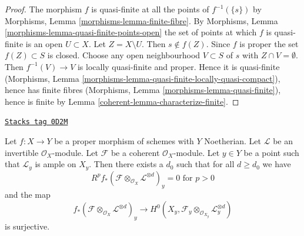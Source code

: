 \begin{proof}

The morphism $f$ is quasi-finite at all the points of $f^{-1}(\{s\})$
by Morphisms, Lemma \ref{morphisms-lemma-finite-fibre}.
By Morphisms, Lemma \ref{morphisms-lemma-quasi-finite-points-open} the
set of points at which $f$ is quasi-finite is an open $U \subset X$.
Let $Z = X \setminus U$. Then $s \not \in f(Z)$. Since $f$ is proper
the set $f(Z) \subset S$ is closed. Choose any open neighbourhood
$V \subset S$ of $s$ with $Z \cap V = \emptyset$. Then
$f^{-1}(V) \to V$ is locally quasi-finite and proper.
Hence it is quasi-finite
(Morphisms, Lemma \ref{morphisms-lemma-quasi-finite-locally-quasi-compact}),
hence has finite fibres
(Morphisms, Lemma \ref{morphisms-lemma-quasi-finite}), hence
is finite by Lemma \ref{coherent-lemma-characterize-finite}.
\end{proof}

\begin{lemma}
\label{coherent-lemma-ample-on-fibre}
\href{https://stacks.math.columbia.edu/tag/0D2M}{\texttt{Stacks tag 0D2M}}

Let $f : X \to Y$ be a proper morphism of schemes with $Y$ Noetherian.
Let $\mathcal{L}$ be an invertible $\mathcal{O}_X$-module.
Let $\mathcal{F}$ be a coherent $\mathcal{O}_X$-module.
Let $y \in Y$ be a point such that $\mathcal{L}_y$ is ample on $X_y$.
Then there exists a $d_0$ such that for all $d \geq d_0$ we have
$$
R^pf_*(\mathcal{F} \otimes_{\mathcal{O}_X} \mathcal{L}^{\otimes d})_y = 0
\text{ for }p > 0
$$
and the map
$$
f_*(\mathcal{F} \otimes_{\mathcal{O}_X} \mathcal{L}^{\otimes d})_y
\longrightarrow
H^0(X_y, \mathcal{F}_y \otimes_{\mathcal{O}_{X_y}} \mathcal{L}_y^{\otimes d})
$$
is surjective.
\end{lemma}


